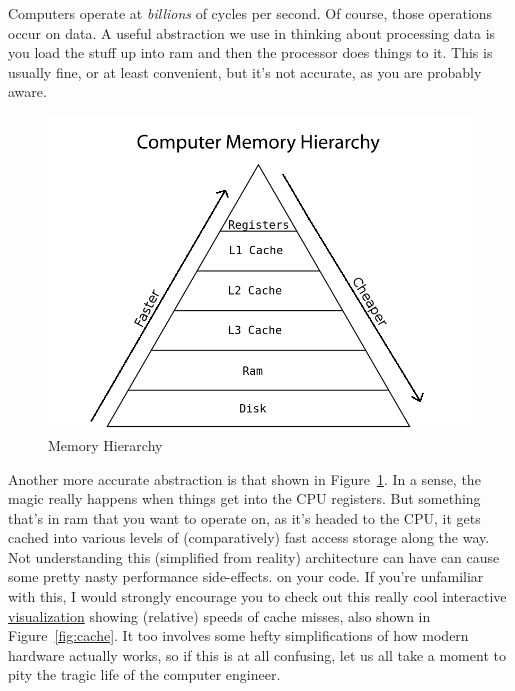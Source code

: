Computers operate at \emph{billions} of cycles per second.  Of course, those  
operations occur on data.  A useful abstraction we use in thinking about 
processing data is you load the stuff up into ram and then the processor does 
things to it.  This is usually fine, or at least convenient, but it's not 
accurate, as you are probably aware.  

\begin{figure}[ht]
  \centering
  \includegraphics[scale=.54]{./include/pics/memory}
  \caption{Memory Hierarchy}
  \label{fig:mem}
\end{figure}
Another more accurate abstraction is that shown in Figure~\ref{fig:mem}.  In a 
sense, the magic really happens when things get into the CPU registers.  But 
something that's in ram that you want to operate on, as it's headed to the CPU, 
it gets cached into various levels of (comparatively) fast access storage along 
the way. Not understanding this (simplified from reality) architecture can have 
can cause some pretty nasty performance side-effects. on your code.
If you're unfamiliar with this, I would strongly encourage you to check out 
this really cool interactive
\href{http://www.overbyte.com.au/misc/Lesson3/CacheFun.html}{visualization} 
showing (relative) speeds of cache misses, also shown in Figure~\ref{fig:cache}. 
It too involves some hefty simplifications of how modern hardware actually 
works, so if this is at all confusing, let us all take a moment to pity the 
tragic life of the computer engineer.


